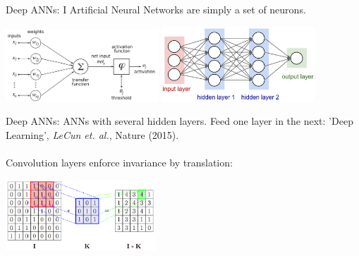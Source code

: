 \documentclass{beamer}
\begin{document}
\begin{frame}{Deep ANNs: I}
    Artificial Neural Networks are simply a set of neurons.

    \begin{center}
      \includegraphics[width=0.43\textwidth]{./Figures/ANNs_supervised_learning/ArtificialNeuronModel_english}
      \hspace{0.1cm}
      \includegraphics[width=0.43\textwidth]{./Figures/ANNs_supervised_learning/artificial_neural_network_1-791x388}
    \end{center}

    Deep ANNs: ANNs with several hidden layers. Feed one layer in the next: 'Deep Learning', \textit{LeCun et. al.}, Nature (2015). \\~\\

    Convolution layers enforce invariance by translation:

    \begin{center}
      \includegraphics[width=0.42\textwidth]{./Figures/ANNs_supervised_learning/convolutional_layer}
    \end{center}
\end{frame}
\end{document}
